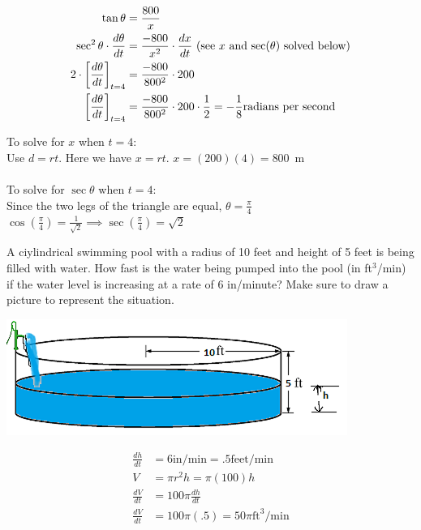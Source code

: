 \documentclass[nooutcomes,handout]{ximera}
\begin{document}
\begin{problem}
\begin{freeResponse}
	\begin{align*}
	\tan {\theta}&=\frac{800}{x}\\
	\sec^2{\theta} \cdot \frac{d\theta}{dt}&=\frac{-800}{x^2}\cdot \frac{dx}{dt}\ \text{(see $x$ and $\sec(\theta)$ solved below)}\\
	2 \cdot \bigg[ \frac{d\theta}{dt} \bigg]_{t=4}&=\frac{-800}{800^2}\cdot 200  \\
	\bigg[ \frac{d\theta}{dt} \bigg]_{t=4}&=\frac{-800}{800^2}\cdot 200 \cdot \frac{1}{2}=-\frac{1}{8} \text{radians per second}
	\end{align*}

To solve for $x$ when $t=4$:\\
Use $d=rt$.  Here we have $x=rt$.  $x=(200)(4)=800$\ m  \\\\

To solve for $\sec{\theta}$ when $t=4$:\\
Since the two legs of the triangle are equal, $\theta=\frac{\pi}{4}$\\
$\cos\left({\frac{\pi}{4}}\right)=\frac{1}{\sqrt{2}} \implies \sec\left({\frac{\pi}{4}}\right)=\sqrt{2}$





\end{freeResponse}
\end{problem}

\begin{problem}
A ciylindrical swimming pool with a radius of 10 feet and height of 5 feet is being filled with water.  How fast is the water being pumped into the pool (in ft$^3$/min) if the water level is increasing at a rate of 6 in/minute?  Make sure to draw a picture to represent the situation.
\begin{freeResponse} \hfil
	\begin{image}
	\includegraphics[scale=.7]{Figure18.png}
	\end{image}
	
	
	\begin{align*}
	\frac{dh}{dt}&=6 \text{in/min}=.5 \text{feet/min}\\
	V&=\pi r^2h=\pi(100)h \\
	\frac{dV}{dt}&=100\pi \frac{dh}{dt}\\
	\frac{dV}{dt}&=100 \pi (.5)=50 \pi \text{ft}^3\text{/min}
	\end{align*}


\end{freeResponse}
	
	
\end{problem}
\end{document}
